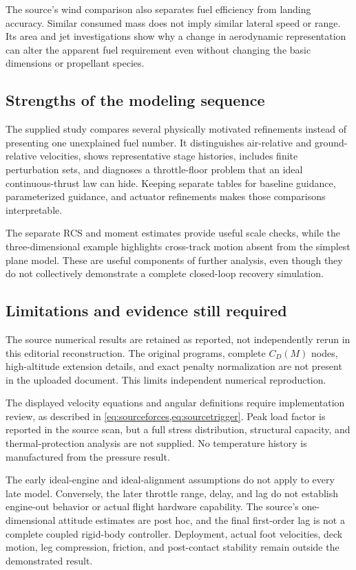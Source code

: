 \documentclass[11pt,a4paper]{article}
\begin{document}
The source's wind comparison also separates fuel efficiency from landing accuracy. Similar consumed mass does not imply similar lateral speed or range. Its area and jet investigations show why a change in aerodynamic representation can alter the apparent fuel requirement even without changing the basic dimensions or propellant species.

\subsection{Strengths of the modeling sequence}
The supplied study compares several physically motivated refinements instead of presenting one unexplained fuel number. It distinguishes air-relative and ground-relative velocities, shows representative stage histories, includes finite perturbation sets, and diagnoses a throttle-floor problem that an ideal continuous-thrust law can hide. Keeping separate tables for baseline guidance, parameterized guidance, and actuator refinements makes those comparisons interpretable.

The separate RCS and moment estimates provide useful scale checks, while the three-dimensional example highlights cross-track motion absent from the simplest plane model. These are useful components of further analysis, even though they do not collectively demonstrate a complete closed-loop recovery simulation.

\subsection{Limitations and evidence still required}
The source numerical results are retained as reported, not independently rerun in this editorial reconstruction. The original programs, complete $C_D(M)$ nodes, high-altitude extension details, and exact penalty normalization are not present in the uploaded document. This limits independent numerical reproduction.

The displayed velocity equations and angular definitions require implementation review, as described in \cref{eq:sourceforces,eq:sourcetrigger}. Peak load factor is reported in the source scan, but a full stress distribution, structural capacity, and thermal-protection analysis are not supplied. No temperature history is manufactured from the pressure result.

The early ideal-engine and ideal-alignment assumptions do not apply to every late model. Conversely, the later throttle range, delay, and lag do not establish engine-out behavior or actual flight hardware capability. The source's one-dimensional attitude estimates are post hoc, and the final first-order lag is not a complete coupled rigid-body controller. Deployment, actual foot velocities, deck motion, leg compression, friction, and post-contact stability remain outside the demonstrated result.
\end{document}
